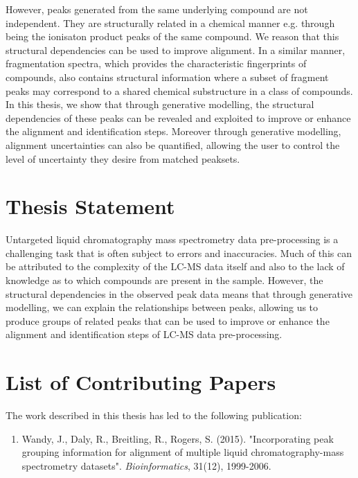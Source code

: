 However, peaks generated from the same underlying compound are not independent. They are structurally related in a chemical manner e.g. through being the ionisaton product peaks of the same compound. We reason that this structural dependencies can be used to improve alignment. In a similar manner, fragmentation spectra, which provides the characteristic fingerprints of compounds, also contains structural information where a subset of fragment peaks may correspond to a shared chemical substructure in a class of compounds. In this thesis, we show that through generative modelling, the structural dependencies of these peaks can be revealed and exploited to improve or enhance the alignment and identification steps. Moreover through generative modelling, alignment uncertainties can also be quantified, allowing the user to control the level of uncertainty they desire from matched peaksets.

\section{Thesis Statement\label{sub:thesis-statement}}

Untargeted liquid chromatography mass spectrometry data pre-processing is a challenging task that is often subject to errors and inaccuracies. Much of this can be attributed to the complexity of the LC-MS data itself and also to the lack of knowledge as to which compounds are present in the sample. However, the structural dependencies in the observed peak data means that through generative modelling, we can explain the relationships between peaks, allowing us to produce groups of related peaks that can be used to improve or enhance the alignment and identification steps of LC-MS data pre-processing.

\section{List of Contributing Papers}

The work described in this thesis has led to the following publication:

\begin{enumerate}
\item Wandy, J., Daly, R., Breitling, R., Rogers, S. (2015). "Incorporating peak grouping information for alignment of multiple liquid chromatography-mass spectrometry datasets". \textit{Bioinformatics}, 31(12), 1999-2006.
\end{enumerate}

